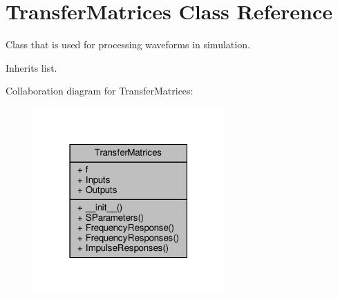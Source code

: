 \hypertarget{classSignalIntegrity_1_1FrequencyDomain_1_1TransferMatrices_1_1TransferMatrices}{}\section{Transfer\+Matrices Class Reference}
\label{classSignalIntegrity_1_1FrequencyDomain_1_1TransferMatrices_1_1TransferMatrices}


Class that is used for processing waveforms in simulation.  




Inherits list.



Collaboration diagram for Transfer\+Matrices\+:\nopagebreak
\begin{figure}[H]
\begin{center}
\leavevmode
\includegraphics[width=207pt]{classSignalIntegrity_1_1FrequencyDomain_1_1TransferMatrices_1_1TransferMatrices__coll__graph}
\end{center}
\end{figure}
